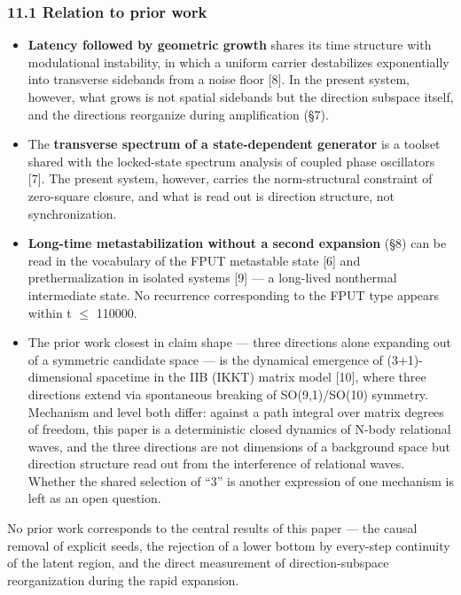 \documentclass[
  a4paper,
]{article}
\providecommand{\tightlist}{%
  \setlength{\itemsep}{0pt}\setlength{\parskip}{0pt}}
\begin{document}
\subsubsection{11.1 Relation to prior
work}\label{relation-to-prior-work}

\begin{itemize}
\tightlist
\item
  \textbf{Latency followed by geometric growth} shares its time
  structure with modulational instability, in which a uniform carrier
  destabilizes exponentially into transverse sidebands from a noise
  floor {[}8{]}. In the present system, however, what grows is not
  spatial sidebands but the direction subspace itself, and the
  directions reorganize during amplification (§7).
\item
  The \textbf{transverse spectrum of a state-dependent generator} is a
  toolset shared with the locked-state spectrum analysis of coupled
  phase oscillators {[}7{]}. The present system, however, carries the
  norm-structural constraint of zero-square closure, and what is read
  out is direction structure, not synchronization.
\item
  \textbf{Long-time metastabilization without a second expansion} (§8)
  can be read in the vocabulary of the FPUT metastable state {[}6{]} and
  prethermalization in isolated systems {[}9{]} --- a long-lived
  nonthermal intermediate state. No recurrence corresponding to the FPUT
  type appears within t \(\le\) 110000.
\item
  The prior work closest in claim shape --- three directions alone
  expanding out of a symmetric candidate space --- is the dynamical
  emergence of (3+1)-dimensional spacetime in the IIB (IKKT) matrix
  model {[}10{]}, where three directions extend via spontaneous breaking
  of SO(9,1)/SO(10) symmetry. Mechanism and level both differ: against a
  path integral over matrix degrees of freedom, this paper is a
  deterministic closed dynamics of N-body relational waves, and the
  three directions are not dimensions of a background space but
  direction structure read out from the interference of relational
  waves. Whether the shared selection of ``3'' is another expression of
  one mechanism is left as an open question.
\end{itemize}

No prior work corresponds to the central results of this paper --- the
causal removal of explicit seeds, the rejection of a lower bottom by
every-step continuity of the latent region, and the direct measurement
of direction-subspace reorganization during the rapid expansion.
\end{document}
